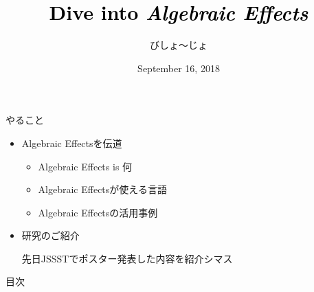 \documentclass[unicode,compress,14pt,CJK%
\directlua{
    handout = os.getenv"HANDOUT"
    local _ = handout and tex.print(",handout")
},t]{beamer}
\title{\textcolor{black}{Dive into \textit{Algebraic Effects}}}
\author{びしょ〜じょ}
\date{September 16, 2018}
\institute{ML Days \#2}
\def\blue#1{\textcolor{blue!70!black}{#1}}
\begin{document}
\maketitle

\switchfooter
\begin{frame}{やること}
    \vfill
    \begin{itemize}
        \item[\faicon{wifi}] \alert{Algebraic Effects}を伝道

            \begin{itemize}
                \item[\coloremoji{🤔}] Algebraic Effects is 何
                \item[\blue{\faicon{language}}] Algebraic Effectsが使える言語
                \item[\coloremoji{🙆}] Algebraic Effectsの活用事例
            \end{itemize}
        \item[\coloremoji{🔬}] 研究のご紹介

            {\small 先日JSSSTでポスター発表した内容を紹介シマス}
    \end{itemize}
    \vfill
\end{frame}

\begin{frame}{目次}
    \tableofcontents
\end{frame}
\switchfooter
\end{document}
